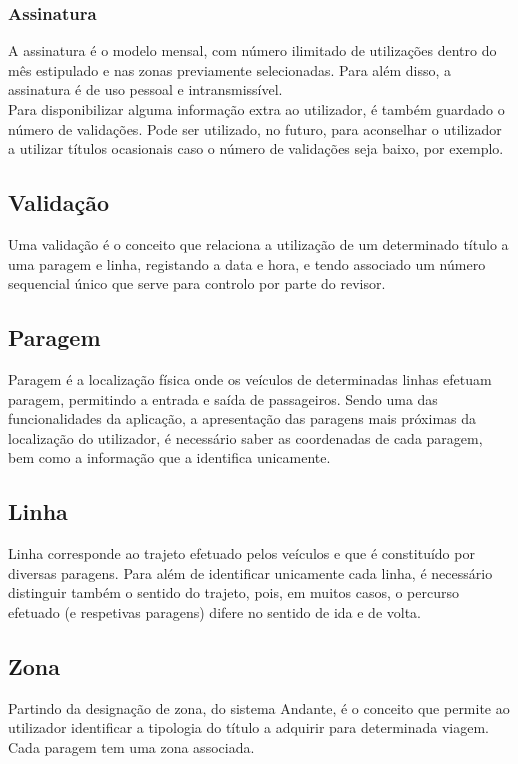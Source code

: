 \subsubsection{Assinatura}

A assinatura é o modelo mensal, com número ilimitado de utilizações dentro do mês estipulado e nas zonas previamente selecionadas. Para além disso, a assinatura é de uso pessoal e intransmissível.
\\Para disponibilizar alguma informação extra ao utilizador, é também guardado o número de validações. Pode ser utilizado, no futuro, para aconselhar o utilizador a utilizar títulos ocasionais caso o número de validações seja baixo, por exemplo.

\subsection{Validação}
Uma validação é o conceito que relaciona a utilização de um determinado título a uma paragem e linha, registando a data e hora, e tendo associado um número sequencial único que serve para controlo por parte do revisor.

\subsection{Paragem}
Paragem é a localização física onde os veículos de determinadas linhas efetuam paragem, permitindo a entrada e saída de passageiros. Sendo uma das funcionalidades da aplicação, a apresentação das paragens mais próximas da localização do utilizador, é necessário saber as coordenadas de cada paragem, bem como a informação que a identifica unicamente.

\subsection{Linha}
Linha corresponde ao trajeto efetuado pelos veículos e que é constituído por diversas paragens. Para além de identificar unicamente cada linha, é necessário distinguir também o sentido do trajeto, pois, em muitos casos, o percurso efetuado (e respetivas paragens) difere no sentido de ida e de volta.

\subsection{Zona}
Partindo da designação de zona, do sistema Andante, é o conceito que permite ao utilizador identificar a tipologia do título a adquirir para determinada viagem. Cada paragem tem uma zona associada.

